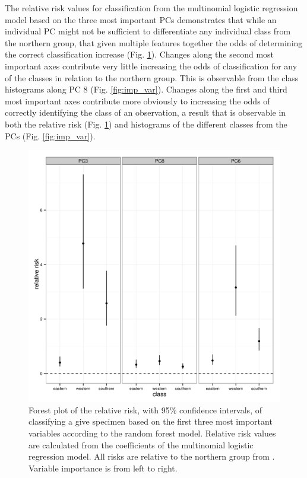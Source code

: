 \documentclass[12pt,letterpaper]{article}\usepackage{graphicx, color}
\begin{document}
The relative risk values for classification from the multinomial logistic regression model based on the three most important PCs demonstrates that while an individual PC might not be sufficient to differentiate any individual class from the northern group, that given multiple features together the odds of determining the correct classification increase (Fig. \ref{fig:rel_risk}). Changes along the second most important axes contribute very little increasing the odds of classification for any of the classes in relation to the northern group. This is observable from the class histograms along PC 8 (Fig. \ref{fig:imp_var}). Changes along the first and third most important axes contribute more obviously to increasing the odds of correctly identifying the class of an observation, a result that is observable in both the relative risk (Fig. \ref{fig:rel_risk}) and histograms of the different classes from the PCs (Fig. \ref{fig:imp_var}).

\begin{figure}[ht]
  \centering
  \includegraphics[width = \textwidth]{figure/rel_risk}
  \caption{Forest plot of the relative risk, with 95\% confidence intervals, of classifying a give specimen based on the first three most important variables according to the random forest model. Relative risk values are calculated from the coefficients of the multinomial logistic regression model. All risks are relative to the northern group from \citet{Spinks2005,Spinks2010}. Variable importance is from left to right.}
  \label{fig:rel_risk}
\end{figure}
\end{document}
